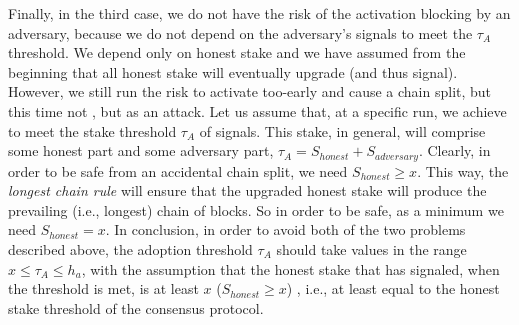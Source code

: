 Finally, in the third case, we do not have the risk of the activation blocking by an adversary, because we do not depend on the adversary's signals to meet the $\tau_A$ threshold. We depend only on honest stake and we have assumed from the beginning that all honest stake will eventually upgrade (and thus signal). However, we still run the risk to activate too-early and cause a chain split, but this time not , but as an attack. Let us assume that, at a specific run, we achieve to meet the stake threshold $\tau_A$ of signals. This stake, in general, will comprise some honest part and some adversary part, $\tau_A = S_{honest} + S_{adversary}$. Clearly, in order to be safe from an accidental chain split, we need $S_{honest} \geq x$. This way, the \emph{longest chain rule} will ensure that the upgraded honest stake will produce the prevailing (i.e., longest) chain of blocks. So in order to be safe, as a minimum we need $S_{honest} = x$. In conclusion, in order to avoid both of the two problems described above, the adoption threshold $\tau_A$ should take values in the range $x \leq \tau_A \leq h_a$, with the assumption that the honest stake that has signaled, when the threshold is met, is at least $x$ ($S_{honest} \geq x$) , i.e., at least equal to the honest stake threshold of the consensus protocol.


 
